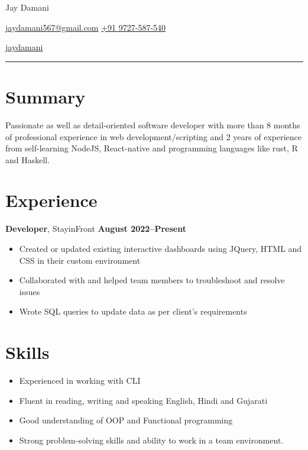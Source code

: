 \documentclass[a4paper]{article}
\begin{document}
\centerline{\Huge {Jay Damani}}
\centerline{\small
     \href{mailto:jaydamani567@gmail.com}{jaydamani567@gmail.com}
     \href{tel:+91-9727587540}{+91 9727-587-540}
}
\centerline{
     \href{https://github.com/jaydamani}{jaydamani}
}
\par\noindent\rule{\textwidth}{1pt}

\section*{ Summary}

Passionate as well as detail-oriented software developer with
more than 8 months of professional experience in web development/scripting and
2 years of experience from self-learning NodeJS, React-native
and programming languages like rust, R  and Haskell.

\section*{ Experience}

\textbf{Developer}, StayinFront \hfill \textbf{August 2022--Present} \
\begin{itemize}
    \item Created or updated existing interactive dashboards using JQuery, HTML and CSS in their custom environment
    \item Collaborated with and helped team members to troubleshoot and resolve issues
    \item Wrote SQL queries to update data as per client's requirements
\end{itemize}

\section*{ Skills}
\begin{itemize}
    \item Experienced in working with CLI
    \item Fluent in reading, writing and speaking English, Hindi and Gujarati
    \item Good understanding of OOP and Functional programming
    \item Strong problem-solving skills and ability to work in a team environment.
\end{itemize}
\end{document}
